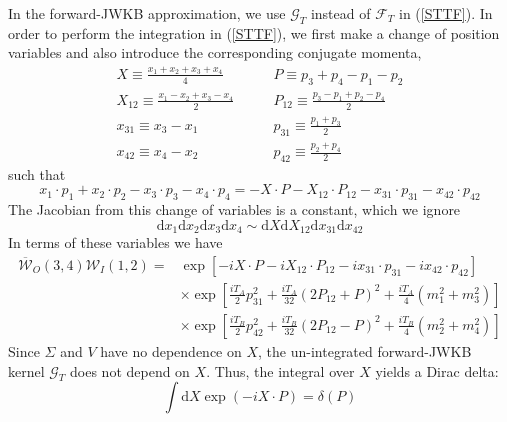 In the forward-JWKB approximation, we use $\mathcal{G}_{T}$ instead of $\mathcal{F}_{T}$ in (\ref{STTF}). In order to perform the integration in (\ref{STTF}), we first make a change of position variables and also introduce the corresponding conjugate momenta,
\begin{align}
	X \equiv \frac{x_{1} + x_{2} + x_{3} + x_{4}}{4} &\qquad P \equiv p_{3} + p_{4} - p_{1} - p_{2} \\
	X_{12} \equiv \frac{x_{1} - x_{2} + x_{3} - x_{4}}{2} &\qquad P_{12} \equiv \frac{p_{3} - p_{1} + p_{2} - p_{4}}{2} \\
	x_{31} \equiv x_{3} - x_{1} &\qquad p_{31} \equiv \frac{p_{1} + p_{3}}{2} \label{p31} \\
	x_{42} \equiv x_{4} - x_{2} &\qquad p_{42} \equiv \frac{p_{2} + p_{4}}{2} \label{p42}
\end{align}
such that
\begin{equation}
	x_{1} \cdot p_{1} + x_{2} \cdot p_{2} - x_{3} \cdot p_{3} - x_{4} \cdot p_{4} = - X \cdot P - X_{12} \cdot P_{12} - x_{31} \cdot p_{31} - x_{42} \cdot p_{42}
\end{equation}
The Jacobian from this change of variables is a constant, which we ignore
\begin{equation}
	\mathrm{d}x_{1} \mathrm{d}x_{2} \mathrm{d}x_{3} \mathrm{d}x_{4} \sim \mathrm{d}X \mathrm{d}X_{12} \mathrm{d}x_{31} \mathrm{d}x_{42}
\end{equation}
In terms of these variables we have
\begin{equation}
\begin{split}
	\overline{\mathcal{W}}_{O}(3, 4) \mathcal{W}_{I}(1, 2) = {}& \exp{\left[ -i X \cdot P -i X_{12} \cdot P_{12} -i x_{31} \cdot p_{31} -i x_{42} \cdot p_{42} \right]} \\
	&\times \exp{\left[ \frac{i T_{A}}{2} p_{31}^{2} + \frac{i T_{A}}{32} \left( 2 P_{1 2} + P \right)^{2} + \frac{i T_{A}}{4} (m_{1}^{2} + m_{3}^{2}) \right]} \\
	&\times \exp{\left[ \frac{i T_{B}}{2} p_{42}^{2} + \frac{i T_{B}}{32} \left( 2 P_{1 2} - P \right)^{2} + \frac{i T_{B}}{4} (m_{2}^{2} + m_{4}^{2}) \right]}
\end{split}
\end{equation}
Since $\Sigma$ and $V$ have no dependence on $X$, the un-integrated forward-JWKB kernel $\mathcal{G}_{T}$ does not depend on $X$. Thus, the integral over $X$ yields a Dirac delta:
\begin{equation}
	\int \mathrm{d}X \exp{(-i X \cdot P)} = \delta(P)
\end{equation}
